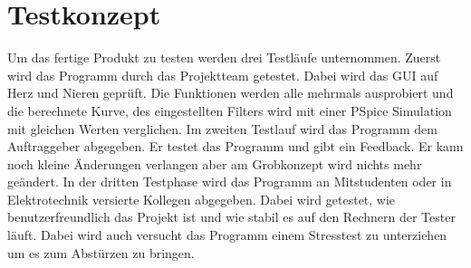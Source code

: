 \section{Testkonzept} \label{sec:Testkonzept}

Um das fertige Produkt zu testen werden drei Testläufe unternommen. 
Zuerst wird das Programm durch das Projektteam getestet. Dabei wird das GUI auf Herz und Nieren geprüft. Die Funktionen werden alle mehrmals ausprobiert und die berechnete Kurve, des eingestellten Filters wird mit einer PSpice Simulation mit gleichen Werten verglichen.
Im zweiten Testlauf wird das Programm dem Auftraggeber abgegeben. Er testet das Programm und gibt ein Feedback. Er kann noch kleine Änderungen verlangen aber am Grobkonzept wird nichts mehr geändert.
In der dritten Testphase wird das Programm an Mitstudenten oder in Elektrotechnik versierte Kollegen abgegeben. Dabei wird getestet, wie benutzerfreundlich das Projekt ist und wie stabil es auf den Rechnern der Tester läuft. Dabei wird auch versucht das Programm einem Stresstest zu unterziehen um es zum Abstürzen zu bringen. 





